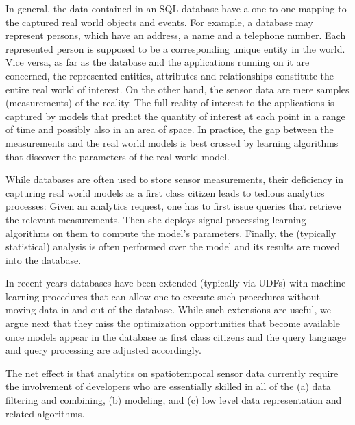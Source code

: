 In general, the data contained in an SQL database have a one-to-one mapping to the captured real world objects and events. For example, a database may represent persons, which have an address, a name and a telephone number. Each represented person is supposed to be a corresponding unique entity in the world. Vice versa, as far as the database and the applications running on it are concerned, the represented entities, attributes and relationships constitute the entire real world of interest. On the other hand, the sensor data are mere samples (measurements) of the reality. The full reality of interest to the applications is captured by models that predict the quantity of interest at each point in a range of time and possibly also in an area of space. In practice, the gap between the measurements and the real world models is best crossed by learning algorithms that discover the parameters of the real world model. 


While databases are often used to store sensor measurements, their deficiency in capturing real world models as a first class citizen leads to tedious analytics processes: Given an analytics request, one has to first issue queries that retrieve the relevant measurements. Then she deploys signal processing learning algorithms on them to compute the model's parameters. Finally,  the (typically statistical) analysis is often performed over the model and its results are moved into the database.

In recent years databases have been extended (typically via UDFs) with machine learning procedures that can allow one to execute such procedures without moving data in-and-out of the database. While such extensions are useful, we argue next that they miss the optimization opportunities that become available once models appear in the database as first class citizens and the query language and query processing are adjusted accordingly.

The net effect is that analytics on spatiotemporal sensor data currently require the involvement of developers who are essentially skilled in all of the (a) data filtering and combining, (b) modeling, and (c) low level data representation and related algorithms. 


